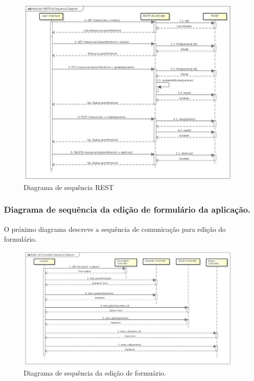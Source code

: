 \documentclass[11pt]{article}
\begin{document}
        \begin{figure}[h!]
          \centering
          \includegraphics[width=1.0\textwidth]{sequence_diagram_main.png}
          \caption{Diagrama de sequência REST}
        \end{figure}
        
  \clearpage
    
      \subsubsection{Diagrama de sequência da edição de formulário da aplicação.}
    
      \paragraph{}
      O próximo diagrama descreve a sequência de comunicação para edição do 
      formulário.

        \begin{figure}[h!]
          \centering
          \includegraphics[width=1.0\textwidth]{sequence_diagram_editor.png}
          \caption{Diagrama de sequência da edição de formuário.}
        \end{figure}
        
\end{document}
